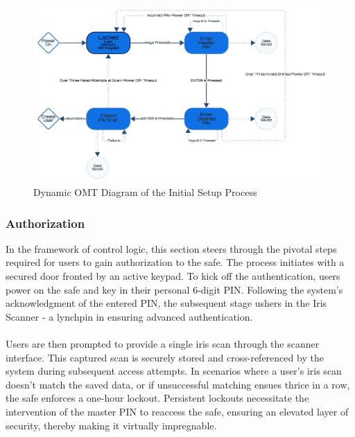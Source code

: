 \documentclass{article}
\begin{document}
\begin{figure}[!h]
    \centering
    \includegraphics[scale=0.28]{docs/figs/initial_setup.png}
    \caption{Dynamic OMT Diagram of the Initial Setup Process \cite{lucidLucidVisual}}
    \label{fig:diagram3}
\end{figure}

\subsubsection{Authorization}
In the framework of control logic, this section steers through the pivotal steps required for users to gain authorization to the safe. The process initiates with a secured door fronted by an active keypad. To kick off the authentication, users power on the safe and key in their personal 6-digit PIN. Following the system's acknowledgment of the entered PIN, the subsequent stage ushers in the Iris Scanner - a lynchpin in ensuring advanced authentication. \\ \\
Users are then prompted to provide a single iris scan through the scanner interface. This captured scan is securely stored and cross-referenced by the system during subsequent access attempts. In scenarios where a user's iris scan doesn't match the saved data, or if unsuccessful matching ensues thrice in a row, the safe enforces a one-hour lockout. Persistent lockouts necessitate the intervention of the master PIN to reaccess the safe, ensuring an elevated layer of security, thereby making it virtually impregnable.
\end{document}
